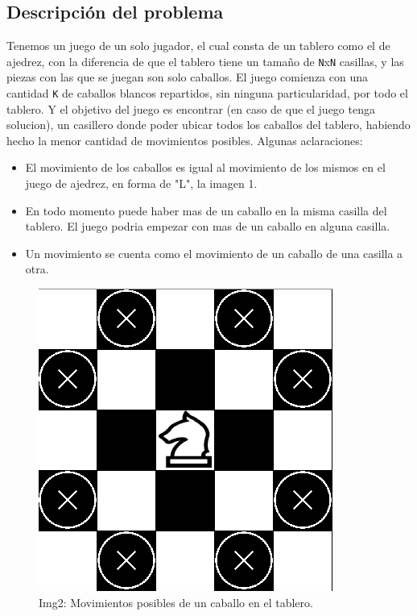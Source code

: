 \subsection{Descripci\'on del problema}

Tenemos un juego de un solo jugador, el cual consta de un tablero como el de ajedrez, con la diferencia de que el tablero tiene un tamaño de \texttt{N}x\texttt{N} casillas, y las piezas con las que se juegan son solo caballos. El juego comienza con una cantidad \texttt{K} de caballos blancos repartidos, sin ninguna particularidad, por todo el tablero. Y el objetivo del juego es encontrar (en caso de que el juego tenga solucion), un casillero donde poder ubicar todos los caballos del tablero, habiendo hecho la menor cantidad de movimientos posibles. 
Algunas aclaraciones:
\begin{itemize}
\item El movimiento de los caballos es igual al movimiento de los mismos en el juego de ajedrez, en forma de "L", la imagen 1.
\item En todo momento puede haber mas de un caballo en la misma casilla del tablero. El juego podria empezar con mas de un caballo en alguna casilla.
\item Un movimiento se cuenta como el movimiento de un caballo de una casilla a otra.
\end{itemize}

\begin{figure}[H]
\begin{center}
\includegraphics[scale=.45]{./imagenes/ej2_movimientoCaballo.png}
\caption{Img2: Movimientos posibles de un caballo en el tablero.}
\end{center}
\end{figure}

\newpage